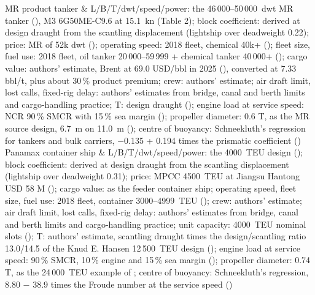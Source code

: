 MR product tanker & L/B/T/dwt/speed/power: the 46\,000--50\,000~dwt MR tanker (\citealp[Table 1]{man2019mr}), M3 6G50ME-C9.6 at 15.1~kn (Table 2); block coefficient: derived at design draught from the scantling displacement (lightship over deadweight 0.22); price: MR of 52k dwt (\citealp[pp. 7 and 16]{allied2026}); operating speed: 2018 fleet, chemical 40k+ (\citealp[Table 35]{faber2020}); fleet size, fuel use: 2018 fleet, oil tanker 20\,000--59\,999 + chemical tanker 40\,000+ (\citealp[Table 35]{faber2020}); cargo value: authors' estimate, Brent at 69.0 USD/bbl in 2025 (\citealp{worldbank2026}), converted at 7.33 bbl/t, plus about 30\,\% product premium; crew: authors' estimate; air draft limit, lost calls, fixed-rig delay: authors' estimates from bridge, canal and berth limits and cargo-handling practice; T: design draught (\citealp[Table 1]{man2019mr}); engine load at service speed: NCR 90\,\% SMCR with 15\,\% sea margin (\citealp[Table 1, p. 13]{man2019mr}); propeller diameter: 0.6 T, as the MR source design, 6.7~m on 11.0~m (\citealp[Tables 1-2]{man2019mr}); centre of buoyancy: Schneekluth's regression for tankers and bulk carriers, \ensuremath{-}0.135 + 0.194 times the prismatic coefficient (\citealp[slide 16]{ventura_estimation}) \\
Panamax container ship & L/B/T/dwt/speed/power: the \num{4000}~TEU design (\citealp[Table 19]{man2024container}); block coefficient: derived at design draught from the scantling displacement (lightship over deadweight 0.31); price: MPCC \num{4500}~TEU at Jiangsu Hantong USD 58 M (\citealp{mpcc2025hantong}); cargo value: as the feeder container ship; operating speed, fleet size, fuel use: 2018 fleet, container 3000--4999~TEU (\citealp[Table 35]{faber2020}); crew: authors' estimate; air draft limit, lost calls, fixed-rig delay: authors' estimates from bridge, canal and berth limits and cargo-handling practice; unit capacity: \num{4000}~TEU nominal slots (\citealp[Table 19]{man2024container}); T: authors' estimate, scantling draught times the design/scantling ratio 13.0/14.5 of the Knud E. Hansen 12\,500~TEU design (\citealp{keh_12500teu}); engine load at service speed: 90\,\% SMCR, 10\,\% engine and 15\,\% sea margin (\citealp[Table 19]{man2024container}); propeller diameter: 0.74 T, as the 24\,000~TEU example of \citet{man2011}; centre of buoyancy: Schneekluth's regression, 8.80 \ensuremath{-} 38.9 times the Froude number at the service speed (\citealp[slide 16]{ventura_estimation}) \\
